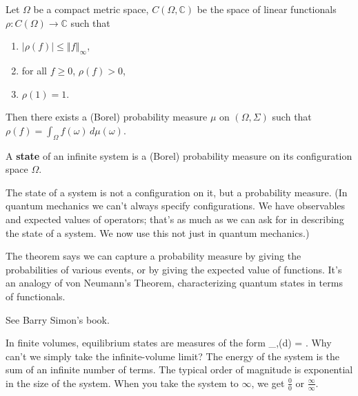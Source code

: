 \documentclass[12pt]{book}
\theoremstyle{norm}
\begin{document}
\begin{theorem}
Let $\Omega$ be a compact metric space, $C(\Omega, \mathbb{C})$ be the space of linear functionals $\rho:C(\Omega)\to \mathbb{C}$ such that 
\begin{enumerate}
\item
$|\rho(f)|\le \left\Vert {f}\right\Vert_{\infty}$,
\item
for all $f\ge 0$, $\rho(f)>0$,
\item
$\rho(1)=1$.
\end{enumerate}
Then there exists a (Borel) probability measure $\mu$ on $(\Omega,\Sigma)$ such that $\rho(f) = \int_{\Omega} f(\omega)\,d\mu(\omega)$.
\end{theorem}
\begin{definition}
A \textbf{state} of an infinite system is a (Borel) probability measure on its configuration space $\Omega$.
\end{definition}
The state of a system is not a configuration on it, but a probability measure. (In quantum mechanics we can't always specify configurations. We have observables and expected values of operators; that's as much as we can ask for in describing the state of a system. We now use this not just in quantum mechanics.)



The theorem says we can capture a probability measure by giving the probabilities of various events, or by giving the expected value of functions.
It's an analogy of von Neumann's Theorem, characterizing quantum states in terms of functionals.

See Barry Simon's book. 

In finite volumes, equilibrium states are measures of the form 
\be\rho_{\Lambda,\beta}(d\sigma) = .\ee
Why can't we simply take the infinite-volume limit? 
The energy of the system is the sum of an infinite number of terms. The typical order of magnitude is exponential in the size of the system. When you take the system to $\infty$, we get $\frac{0}{0}$ or $\frac{\infty}{\infty}$.
\end{document}
